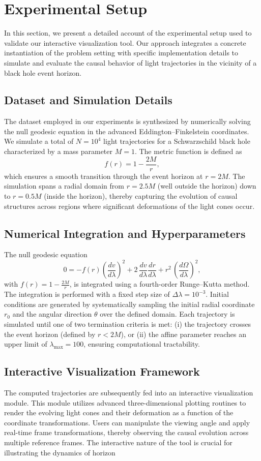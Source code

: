 \documentclass{article}
\begin{document}
\section{Experimental Setup}In this section, we present a detailed account of the experimental setup used to validate our interactive visualization tool. Our approach integrates a concrete instantiation of the problem setting with specific implementation details to simulate and evaluate the causal behavior of light trajectories in the vicinity of a black hole event horizon.\subsection{Dataset and Simulation Details}The dataset employed in our experiments is synthesized by numerically solving the null geodesic equation in the advanced Eddington--Finkelstein coordinates. We simulate a total of $N=10^4$ light trajectories for a Schwarzschild black hole characterized by a mass parameter $M=1$. The metric function is defined as\begin{equation}f(r)=1-\frac{2M}{r},\end{equation}which ensures a smooth transition through the event horizon at $r=2M$. The simulation spans a radial domain from $r=2.5M$ (well outside the horizon) down to $r=0.5M$ (inside the horizon), thereby capturing the evolution of causal structures across regions where significant deformations of the light cones occur.\subsection{Numerical Integration and Hyperparameters}The null geodesic equation\begin{equation}0 = -f(r)\left(\frac{dv}{d\lambda}\right)^2 + 2\,\frac{dv}{d\lambda}\frac{dr}{d\lambda} + r^2\,\left(\frac{d\Omega}{d\lambda}\right)^2,\end{equation}with $f(r)=1-\frac{2M}{r}$, is integrated using a fourth-order Runge--Kutta method. The integration is performed with a fixed step size of $\Delta \lambda=10^{-3}$. Initial conditions are generated by systematically sampling the initial radial coordinate $r_0$ and the angular direction $\theta$ over the defined domain. Each trajectory is simulated until one of two termination criteria is met: (i) the trajectory crosses the event horizon (defined by $r<2M$), or (ii) the affine parameter reaches an upper limit of $\lambda_{\max}=100$, ensuring computational tractability.\subsection{Interactive Visualization Framework}The computed trajectories are subsequently fed into an interactive visualization module. This module utilizes advanced three-dimensional plotting routines to render the evolving light cones and their deformation as a function of the coordinate transformations. Users can manipulate the viewing angle and apply real-time frame transformations, thereby observing the causal evolution across multiple reference frames. The interactive nature of the tool is crucial for illustrating the dynamics of horizon 
\end{document}
